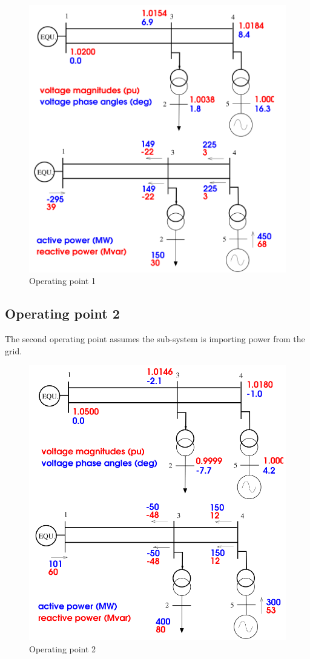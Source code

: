 \documentclass[a4paper,11pt,oneside,onecolumn]{article}
\begin{document}
\begin{figure}[H]
	\centering
	\includegraphics[width=0.9\linewidth]{OP1}
	\caption{Operating point 1}
	\label{fig:op1}
\end{figure}

\subsection{Operating point 2}

The second operating point assumes the sub-system is importing power from the grid.

\begin{figure}[H]
	\centering
	\includegraphics[width=0.9\linewidth]{OP2}
	\caption{Operating point 2}
	\label{fig:op2}
\end{figure}
\end{document}

